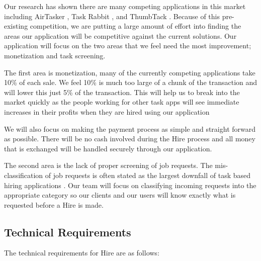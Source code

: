 \documentclass[11pt]{article}
\begin{document}
Our research has shown there are many competing applications in this market including AirTasker \cite{AirTasker}, Task Rabbit \cite{TaskRabbit}, and ThumbTack \cite{ThumbTack}. 
Because of this pre-existing competition, we are putting a large amount of effort into finding the areas our application will be competitive against the current solutions. 
Our application will focus on the two areas that we feel need the most improvement; monetization and task screening.

The first area is monetization, many of the currently competing applications take 10\% of each sale. 
We feel 10\% is much too large of a chunk of the transaction and will lower this just 5\% of the transaction. 
This will help us to break into the market quickly as the people working for other task apps will see immediate increases in their profits when they are hired using our application

We will also focus on making the payment process as simple and straight forward as possible. 
There will be no cash involved during the Hire process and all money that is exchanged will be handled securely through our application.

The second area is the lack of proper screening of job requests. 
The mis-classification of job requests is often stated as the largest downfall of task based hiring applications \cite{ThumbTack_sucks}. 
Our team will focus on classifying incoming requests into the appropriate category so our clients and our users will know exactly what is requested before a Hire is made.

\subsection{Technical Requirements}\label{technical-requirements-subsection}

The technical requirements for Hire are as follows:
\end{document}
